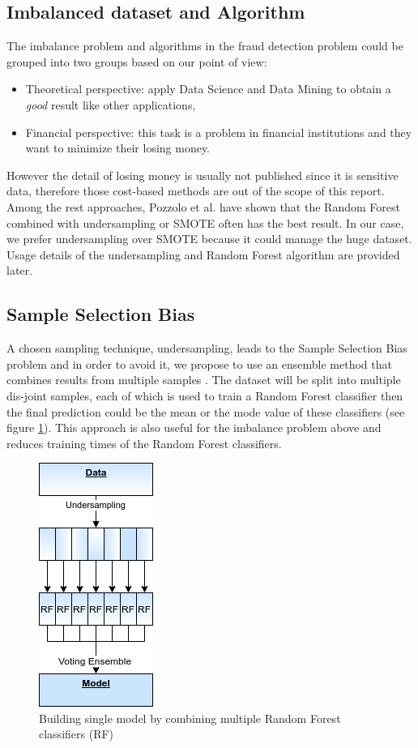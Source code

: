 \subsection*{Imbalanced dataset and Algorithm}

The imbalance problem and algorithms in the fraud detection problem could be grouped into two groups based on our point of view:


\begin{itemize}
\item Theoretical perspective: apply Data Science and Data Mining to obtain a \textit{good} result like other applications,
\item Financial perspective: this task is a problem in financial institutions and they want to minimize their losing money.
\end{itemize}


However the detail of losing money is usually not published since it is sensitive data, therefore those cost-based methods are out of the scope of this report. Among the rest approaches, Pozzolo et al. \citep{dal2013racing} have shown that the Random Forest combined with undersampling or SMOTE often has the best result. In our case, we prefer undersampling over SMOTE because it could manage the huge dataset. Usage details of the undersampling and Random Forest algorithm are provided later.


\subsection*{Sample Selection Bias}

A chosen sampling technique, undersampling, leads to the Sample Selection Bias problem and in order to avoid it, we propose to use an ensemble method that combines results from multiple samples \citep{fan2007sample}. The dataset will be split into multiple dis-joint samples, each of which is used to train a Random Forest classifier then the final prediction could be the mean or the mode value of these classifiers (see figure \ref{img:single_rf}). This approach is also useful for the imbalance problem above and reduces training times of the Random Forest classifiers.


\begin{figure}
\centering
\caption{Building single model by combining multiple Random Forest classifiers (RF)}
\label{img:single_rf}
\includegraphics[scale=0.7]{Images/FDS_single_RF.png}
\end{figure}


